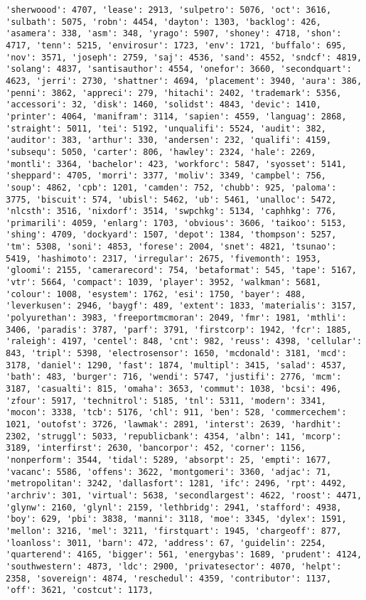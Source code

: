 \documentclass[11pt]{article}
\begin{document}
\begin{Verbatim}[commandchars=\\\{\}]
'sherwoood': 4707, 'lease': 2913, 'sulpetro': 5076, 'oct': 3616, 'sulbath': 5075, 'robn': 4454, 'dayton': 1303, 'backlog': 426, 'asamera': 338, 'asm': 348, 'yrago': 5907, 'shoney': 4718, 'shon': 4717, 'tenn': 5215, 'envirosur': 1723, 'env': 1721, 'buffalo': 695, 'nov': 3571, 'joseph': 2759, 'saj': 4536, 'sand': 4552, 'sndcf': 4819, 'solang': 4837, 'santisauthor': 4554, 'onefor': 3660, 'secondquart': 4623, 'jerri': 2730, 'shattner': 4694, 'placement': 3940, 'aura': 386, 'penni': 3862, 'appreci': 279, 'hitachi': 2402, 'trademark': 5356, 'accessori': 32, 'disk': 1460, 'solidst': 4843, 'devic': 1410, 'printer': 4064, 'manifram': 3114, 'sapien': 4559, 'languag': 2868, 'straight': 5011, 'tei': 5192, 'unqualifi': 5524, 'audit': 382, 'auditor': 383, 'arthur': 330, 'andersen': 232, 'qualifi': 4159, 'subsequ': 5050, 'carter': 806, 'hawley': 2324, 'hale': 2269, 'montli': 3364, 'bachelor': 423, 'workforc': 5847, 'syosset': 5141, 'sheppard': 4705, 'morri': 3377, 'moliv': 3349, 'campbel': 756, 'soup': 4862, 'cpb': 1201, 'camden': 752, 'chubb': 925, 'paloma': 3775, 'biscuit': 574, 'ubisl': 5462, 'ub': 5461, 'unalloc': 5472, 'nlcsth': 3516, 'nixdorf': 3514, 'swpchkg': 5134, 'caphhkg': 776, 'primarili': 4059, 'enlarg': 1703, 'obvious': 3606, 'taikoo': 5153, 'shing': 4709, 'dockyard': 1507, 'depot': 1384, 'thompson': 5257, 'tm': 5308, 'soni': 4853, 'forese': 2004, 'snet': 4821, 'tsunao': 5419, 'hashimoto': 2317, 'irregular': 2675, 'fivemonth': 1953, 'gloomi': 2155, 'camerarecord': 754, 'betaformat': 545, 'tape': 5167, 'vtr': 5664, 'compact': 1039, 'player': 3952, 'walkman': 5681, 'colour': 1008, 'esystem': 1762, 'esi': 1750, 'bayer': 488, 'leverkusen': 2946, 'baygf': 489, 'extent': 1833, 'materialis': 3157, 'polyurethan': 3983, 'freeportmcmoran': 2049, 'fmr': 1981, 'mthli': 3406, 'paradis': 3787, 'parf': 3791, 'firstcorp': 1942, 'fcr': 1885, 'raleigh': 4197, 'centel': 848, 'cnt': 982, 'reuss': 4398, 'cellular': 843, 'tripl': 5398, 'electrosensor': 1650, 'mcdonald': 3181, 'mcd': 3178, 'daniel': 1290, 'fast': 1874, 'multipl': 3415, 'salad': 4537, 'bath': 483, 'burger': 716, 'wendi': 5747, 'justifi': 2776, 'mcm': 3187, 'casualti': 815, 'omaha': 3653, 'commut': 1038, 'bcsi': 496, 'zfour': 5917, 'technitrol': 5185, 'tnl': 5311, 'modern': 3341, 'mocon': 3338, 'tcb': 5176, 'chl': 911, 'ben': 528, 'commercechem': 1021, 'outofst': 3726, 'lawmak': 2891, 'interst': 2639, 'hardhit': 2302, 'struggl': 5033, 'republicbank': 4354, 'albn': 141, 'mcorp': 3189, 'interfirst': 2630, 'bancorpor': 452, 'corner': 1156, 'nonperform': 3544, 'tidal': 5289, 'absorpt': 25, 'empti': 1677, 'vacanc': 5586, 'offens': 3622, 'montgomeri': 3360, 'adjac': 71, 'metropolitan': 3242, 'dallasfort': 1281, 'ifc': 2496, 'rpt': 4492, 'archriv': 301, 'virtual': 5638, 'secondlargest': 4622, 'roost': 4471, 'glynw': 2160, 'glynl': 2159, 'lethbridg': 2941, 'stafford': 4938, 'boy': 629, 'pbi': 3838, 'manni': 3118, 'moe': 3345, 'dylex': 1591, 'mellon': 3216, 'mel': 3211, 'firstquart': 1945, 'chargeoff': 877, 'loanloss': 3011, 'barn': 472, 'address': 67, 'guidelin': 2254, 'quarterend': 4165, 'bigger': 561, 'energybas': 1689, 'prudent': 4124, 'southwestern': 4873, 'ldc': 2900, 'privatesector': 4070, 'helpt': 2358, 'sovereign': 4874, 'reschedul': 4359, 'contributor': 1137, 'off': 3621, 'costcut': 1173, 
\end{Verbatim}
\end{document}
